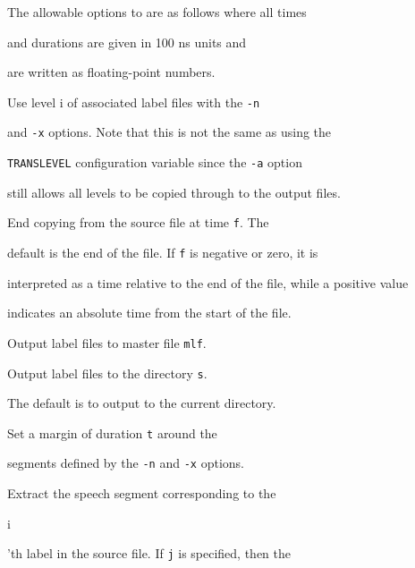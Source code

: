 The allowable options to  are as follows where all times


and durations are given in 100 ns units and


are written as floating-point numbers.








\begin{optlist}





   Use level i of associated label files with the \texttt{-n}


   and  \texttt{-x} options.  Note that this is not the same as using the


 \texttt{TRANSLEVEL} configuration variable since the  \texttt{-a} option


still allows all levels to be copied through to the output files.





   End copying from the source file at time \texttt{f}.  The


 default is the end of the file. If \texttt{f} is negative or zero, it is


 interpreted as a time relative to the end of the file, while a positive value


 indicates an absolute time from the start of the file.





  Output label files to master file \texttt{mlf}.





  Output label files to the directory \texttt{s}.


    The default is to output to the current directory.


  


  Set a margin of duration \texttt{t} around the


    segments defined by the \texttt{-n} and \texttt{-x} options. 





  Extract the speech segment corresponding to the {\tt


     i}'th label in the source file.  If \texttt{j} is specified, then the



\end{optlist}
